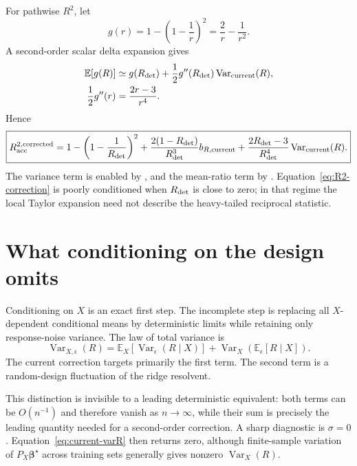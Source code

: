 \documentclass[11pt]{article}
\newcommand{\E}{\mathbb{E}}
\newcommand{\Var}{\operatorname{Var}}
\newcommand{\bstar}{\bm\beta^\star}
\begin{document}
For pathwise \(R^2\), let
\begin{equation}
  g(r)=1-\left(1-\frac1r\right)^2
      =\frac{2}{r}-\frac{1}{r^2}.
\end{equation}
A second-order scalar delta expansion gives
\begin{align}
  \E[g(R)]
  &\simeq
  g(R_{\rm det})
  +\frac12g''(R_{\rm det})\Var_{\rm current}(R),\\
  \frac12g''(r)&=\frac{2r-3}{r^4}.
\end{align}
Hence
\begin{equation}
\boxed{
  R_{\rm acc}^{2,\rm corrected}
  =
  1-\left(1-\frac{1}{R_{\rm det}}\right)^2
  +\frac{2(1-R_{\rm det})}{R_{\rm det}^3}
   b_{R,{\rm current}}
  +
  \frac{2R_{\rm det}-3}{R_{\rm det}^4}
  \Var_{\rm current}(R).
}
\label{eq:R2-correction}
\end{equation}
The variance term is enabled by , and the
mean-ratio term by .
Equation~\eqref{eq:R2-correction} is poorly conditioned when
\(R_{\rm det}\) is close to zero; in that regime the local Taylor expansion
need not describe the heavy-tailed reciprocal statistic.

\section{What conditioning on the design omits}

Conditioning on \(X\) is an exact first step.  The incomplete step is replacing
all \(X\)-dependent conditional means by deterministic limits while retaining
only response-noise variance.  The law of total variance is
\begin{equation}
\boxed{
  \Var_{X,\epsilon}(R)
  =
  \E_X\!\left[\Var_\epsilon(R\mid X)\right]
  +
  \Var_X\!\left(\E_\epsilon[R\mid X]\right).
}
\label{eq:total-variance}
\end{equation}
The current correction targets primarily the first term.  The second term is
a random-design fluctuation of the ridge resolvent.

This distinction is invisible to a leading deterministic equivalent: both
terms can be \(O(n^{-1})\) and therefore vanish as \(n\to\infty\), while their
sum is precisely the leading quantity needed for a second-order correction.
A sharp diagnostic is \(\sigma=0\).  Equation~\eqref{eq:current-varR} then
returns zero, although finite-sample variation of \(P_X\bstar\) across
training sets generally gives nonzero \(\Var_X(R)\).
\end{document}
